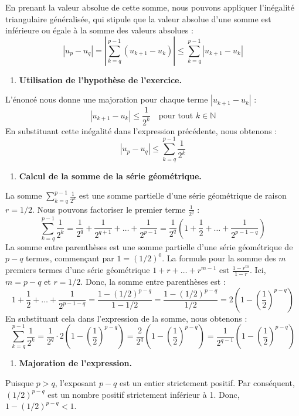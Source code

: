 \documentclass[a4paper,11pt]{report}
\begin{document}
    En prenant la valeur absolue de cette somme, nous pouvons appliquer l'inégalité triangulaire généralisée, qui stipule que la valeur absolue d'une somme est inférieure ou égale à la somme des valeurs absolues :
    $$ |u_p - u_q| = \left| \sum_{k=q}^{p-1} (u_{k+1} - u_k) \right| \le \sum_{k=q}^{p-1} |u_{k+1} - u_k| $$
\begin{enumerate}
\item \textbf{Utilisation de l'hypothèse de l'exercice.}
\end{enumerate}
    L'énoncé nous donne une majoration pour chaque terme $|u_{k+1} - u_k|$ :
    $$ |u_{k+1} - u_k| \le \frac{1}{2^k} \quad \text{pour tout } k \in \mathbb{N} $$
    En substituant cette inégalité dans l'expression précédente, nous obtenons :
    $$ |u_p - u_q| \le \sum_{k=q}^{p-1} \frac{1}{2^k} $$
\begin{enumerate}
\item \textbf{Calcul de la somme de la série géométrique.}
\end{enumerate}
    La somme $\sum_{k=q}^{p-1} \frac{1}{2^k}$ est une somme partielle d'une série géométrique de raison $r = 1/2$.
    Nous pouvons factoriser le premier terme $\frac{1}{2^q}$ :
    $$ \sum_{k=q}^{p-1} \frac{1}{2^k} = \frac{1}{2^q} + \frac{1}{2^{q+1}} + \dots + \frac{1}{2^{p-1}} = \frac{1}{2^q} \left( 1 + \frac{1}{2} + \dots + \frac{1}{2^{p-1-q}} \right) $$
    La somme entre parenthèses est une somme partielle d'une série géométrique de $p-q$ termes, commençant par $1 = (1/2)^0$. La formule pour la somme des $m$ premiers termes d'une série géométrique $1 + r + \dots + r^{m-1}$ est $\frac{1-r^m}{1-r}$. Ici, $m = p-q$ et $r=1/2$.
    Donc, la somme entre parenthèses est :
    $$ 1 + \frac{1}{2} + \dots + \frac{1}{2^{p-1-q}} = \frac{1 - (1/2)^{p-q}}{1 - 1/2} = \frac{1 - (1/2)^{p-q}}{1/2} = 2 \left( 1 - \left(\frac{1}{2}\right)^{p-q} \right) $$
    En substituant cela dans l'expression de la somme, nous obtenons :
    $$ \sum_{k=q}^{p-1} \frac{1}{2^k} = \frac{1}{2^q} \cdot 2 \left( 1 - \left(\frac{1}{2}\right)^{p-q} \right) = \frac{2}{2^q} \left( 1 - \left(\frac{1}{2}\right)^{p-q} \right) = \frac{1}{2^{q-1}} \left( 1 - \left(\frac{1}{2}\right)^{p-q} \right) $$
\begin{enumerate}
\item \textbf{Majoration de l'expression.}
\end{enumerate}
    Puisque $p > q$, l'exposant $p-q$ est un entier strictement positif. Par conséquent, $(1/2)^{p-q}$ est un nombre positif strictement inférieur à 1.
    Donc, $1 - (1/2)^{p-q} < 1$.
\end{document}
